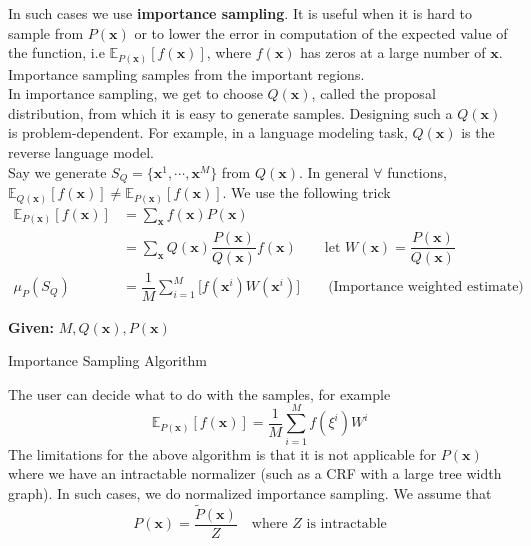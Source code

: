 In such cases we use \textbf{importance sampling}. It is useful when it is hard to sample from $P(\mathbf x)$ or to lower the error in computation of the expected value of the function, i.e $\mathbb{E}_{P(\mathbf x)} [f(\mathbf x)]$, where $f(\mathbf x)$ has zeros at a large number of $\mathbf x$. Importance sampling samples from the important regions. \\
In importance sampling, we get to choose $Q(\mathbf x)$, called the proposal distribution, from which it is easy to generate samples. Designing such a $Q(\mathbf x)$ is problem-dependent. For example, in a language modeling task, $Q(\mathbf x)$ is the reverse language model. \\
Say we generate $S_Q = \{\mathbf x^1, \cdots, \mathbf x^M\}$ from $Q(\mathbf x)$. In general $\forall$ functions, $\mathbb{E}_{Q(\mathbf x)}[f(\mathbf x)] \neq \mathbb{E}_{P(\mathbf x)}[f(\mathbf x)] $. We use the following trick
\begin{align*}
	\mathbb{E}_{P(\mathbf x)}[f(\mathbf x)] &= \sum_{\mathbf x} f(\mathbf x)P(\mathbf x) \\
	&= \sum_{\mathbf x} Q(\mathbf x) \dfrac{P(\mathbf x)}{Q(\mathbf x)}f(\mathbf x) \qquad\text{let } W(\mathbf x) = \dfrac{P(\mathbf x)}{Q(\mathbf x)}\\
\mu_P(S_Q)	&= \dfrac{1}{M} \sum_{i=1}^M \big[ f(\mathbf x^i) W(\mathbf x^i) \big] \qquad\text{(Importance weighted estimate)}
\end{align*}
\begin{algorithm}[H]\label{alg:s-is}
	\DontPrintSemicolon
	\textbf{Given:} $M, Q(\mathbf x), P(\mathbf x)$\;
	\caption{Importance Sampling Algorithm}
\end{algorithm}
The user can decide what to do with the samples, for example
\begin{equation}
	\mathbb{E}_{P(\mathbf x)}[f(\mathbf x)] = \dfrac{1}{M} \sum_{i=1}^M f(\xi^i) W^i
\end{equation}
The limitations for the above algorithm is that it is not applicable for $P(\mathbf x)$ where we have an intractable normalizer (such as a CRF with a large tree width graph). In such cases, we do normalized importance sampling. We assume that
\begin{equation}
	P(\mathbf x) = \dfrac{\widetilde{P}(\mathbf x)}{Z} \quad \text{where }Z \text{ is intractable} 
\end{equation}
